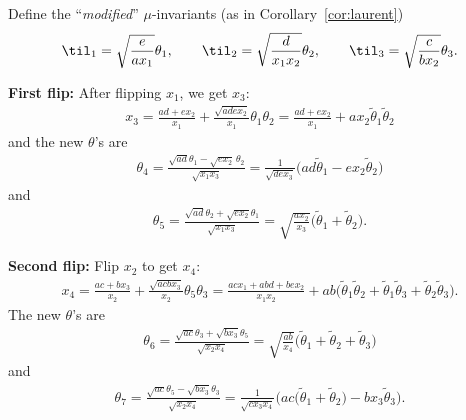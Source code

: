 Define the ``\emph{modified}'' $\mu$-invariants (as in Corollary~\ref{cor:laurent})
\[ \til_1 = \sqrt{\frac{e}{ax_1}} \theta_1, \qquad \til_2 = \sqrt{\frac{d}{x_1x_2}} \theta_2, \qquad \til_3 =\sqrt{\frac{c}{bx_2}} \theta_3. \]

\textbf{First flip:} After flipping $x_1$, we get $x_3$:
\begin{align*}
 x_3 = \frac{ad + ex_2}{x_1} + \frac{\sqrt{adex_2}}{x_1} \theta_1 \theta_2
 = \frac{ad+ex_2}{x_1} + ax_2 \widetilde{\theta}_1 \widetilde{\theta}_2
\end{align*}
and the new $\theta$'s are
\begin{align*}
 \theta_4 = \frac{\sqrt{ad} \theta_1 - \sqrt{ex_2} \, \theta_2}{\sqrt{x_1x_3}}
 = \frac{1}{\sqrt{dex_3}} \big( ad \widetilde{\theta}_1 - ex_2 \widetilde{\theta}_2 \big)
\end{align*}
and
\begin{align*}
 \theta_5 = \frac{\sqrt{ad} \theta_2 + \sqrt{ex_2} \theta_1}{\sqrt{x_1x_3}}
 = \sqrt{\frac{ax_2}{x_3}} \big( \widetilde{\theta}_1 + \widetilde{\theta}_2 \big).
\end{align*}

\textbf{Second flip:} Flip $x_2$ to get $x_4$:
\begin{align*}
 x_4 = \frac{ac + bx_3}{x_2} + \frac{\sqrt{acbx_3}}{x_2} \theta_5 \theta_3
 = \frac{acx_1+abd+bex_2}{x_1x_2} + ab \big( \widetilde{\theta}_1 \widetilde{\theta}_2 + \widetilde{\theta}_1 \widetilde{\theta}_3 + \widetilde{\theta}_2 \widetilde{\theta}_3 \big).
\end{align*}
The new $\theta$'s are
\begin{align*}
 \theta_6 = \frac{\sqrt{ac} \theta_3 + \sqrt{bx_3} \theta_5}{\sqrt{x_2x_4}}
 = \sqrt{\frac{ab}{x_4}} \big( \widetilde{\theta}_1 + \widetilde{\theta}_2 + \widetilde{\theta}_3 \big)
\end{align*}
and
\begin{align*}
 \theta_7 = \frac{\sqrt{ac} \theta_5 - \sqrt{bx_3} \theta_3}{\sqrt{x_2x_4}}
 = \frac{1}{\sqrt{cx_3x_4}} \big( ac\big(\widetilde{\theta}_1 + \widetilde{\theta}_2\big) - bx_3 \widetilde{\theta}_3 \big).
\end{align*}

